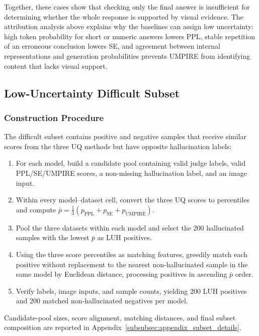 Together, these cases show that checking only the final answer is insufficient for determining whether the whole response is supported by visual evidence. The attribution analysis above explains why the baselines can assign low uncertainty: high token probability for short or numeric answers lowers PPL, stable repetition of an erroneous conclusion lowers SE, and agreement between internal representations and generation probabilities prevents UMPIRE from identifying content that lacks visual support.

\subsection{Low-Uncertainty Difficult Subset}
\label{subsec:luh_subset}

\subsubsection{Construction Procedure}

The difficult subset contains positive and negative samples that receive similar scores from the three UQ methods but have opposite hallucination labels:

\begin{enumerate}[label=\textbf{Step \arabic*:}, leftmargin=5.2em, labelsep=0.7em]
\item For each model, build a candidate pool containing valid judge labels, valid PPL/SE/UMPIRE scores, a non-missing hallucination label, and an image input.
\item Within every model--dataset cell, convert the three UQ scores to percentiles and compute $\bar p=\frac{1}{3}(p_{\mathrm{PPL}}+p_{\mathrm{SE}}+p_{\mathrm{UMPIRE}})$.
\item Pool the three datasets within each model and select the 200 hallucinated samples with the lowest $\bar p$ as LUH positives.
\item Using the three score percentiles as matching features, greedily match each positive without replacement to the nearest non-hallucinated sample in the same model by Euclidean distance, processing positives in ascending $\bar p$ order.
\item Verify labels, image inputs, and sample counts, yielding 200 LUH positives and 200 matched non-hallucinated negatives per model.
\end{enumerate}

Candidate-pool sizes, score alignment, matching distances, and final subset composition are reported in Appendix~\ref{subsubsec:appendix_subset_details}.

